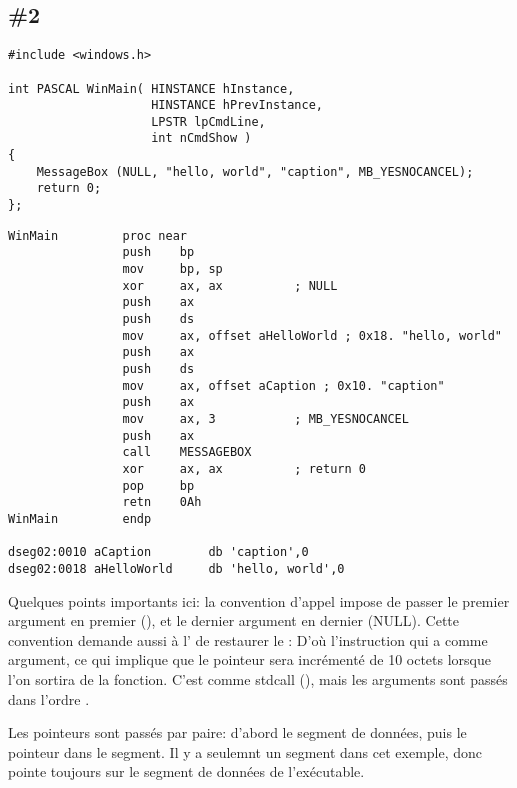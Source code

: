 \subsection{\Example{} \#2}
\label{win16_messagebox}

\begin{lstlisting}[style=customc]
#include <windows.h>

int PASCAL WinMain( HINSTANCE hInstance,
                    HINSTANCE hPrevInstance,
                    LPSTR lpCmdLine,
                    int nCmdShow )
{
	MessageBox (NULL, "hello, world", "caption", MB_YESNOCANCEL);
	return 0;
};
\end{lstlisting}

\begin{lstlisting}[style=customasmx86]
WinMain         proc near
                push    bp
                mov     bp, sp
                xor     ax, ax          ; NULL
                push    ax
                push    ds
                mov     ax, offset aHelloWorld ; 0x18. "hello, world"
                push    ax
                push    ds
                mov     ax, offset aCaption ; 0x10. "caption"
                push    ax
                mov     ax, 3           ; MB_YESNOCANCEL
                push    ax
                call    MESSAGEBOX
                xor     ax, ax          ; return 0
                pop     bp
                retn    0Ah
WinMain         endp

dseg02:0010 aCaption        db 'caption',0
dseg02:0018 aHelloWorld     db 'hello, world',0
\end{lstlisting}

Quelques points importants ici: la convention d'appel  impose de passer
le premier argument en premier (), et le dernier argument\EMDASH{}
en dernier (NULL).
Cette convention demande aussi à l' de restaurer le :
D'où l'instruction  qui a  comme argument, ce qui implique que le
pointeur sera incrémenté de 10 octets lorsque l'on sortira de la fonction.
C'est comme stdcall (), mais les arguments sont passés dans l'ordre
.

Les pointeurs sont passés par paire: d'abord le segment de données, puis le pointeur
dans le segment.
Il y a seulemnt un segment dans cet exemple, donc  pointe toujours sur le segment
de données de l'exécutable.
